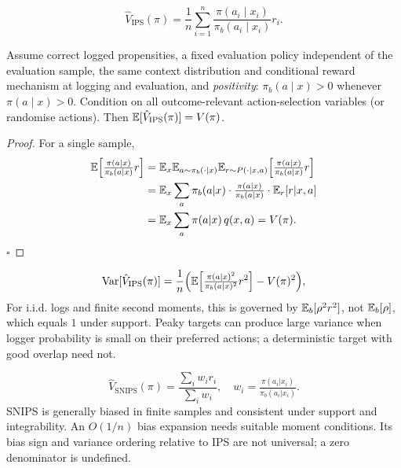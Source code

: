 \documentclass[11pt,oneside]{scrbook}
\begin{document}
\begin{definition}
\[
\hat V_{\mathrm{IPS}}(\pi) = \frac{1}{n} \sum_{i=1}^n \frac{\pi(a_i \mid x_i)}{\pi_b(a_i \mid x_i)} r_i.
\]
\end{definition}

\begin{theorem}
Assume correct logged propensities, a fixed evaluation policy independent of the evaluation sample, the same context distribution and conditional reward mechanism at logging and evaluation, and \emph{positivity}: $\pi_b(a \mid x)>0$ whenever $\pi(a \mid x)>0$. Condition on all outcome-relevant action-selection variables (or randomise actions). Then $\mathbb{E}[\hat V_{\mathrm{IPS}}(\pi)] = V(\pi)$.
\end{theorem}

\begin{proof}
For a single sample,
\begin{align*}
\mathbb{E}\Big[\tfrac{\pi(a|x)}{\pi_b(a|x)} r\Big]
&= \mathbb{E}_x \mathbb{E}_{a \sim \pi_b(\cdot|x)} \mathbb{E}_{r \sim P(\cdot|x,a)}\Big[\tfrac{\pi(a|x)}{\pi_b(a|x)} r\Big] \\
&= \mathbb{E}_x \sum_a \pi_b(a|x) \cdot \tfrac{\pi(a|x)}{\pi_b(a|x)} \cdot \mathbb{E}_r[r|x,a] \\
&= \mathbb{E}_x \sum_a \pi(a|x)\, q(x, a) = V(\pi).
\end{align*}
$\square$
\end{proof}

\begin{theorem}
\[
\operatorname{Var}[\hat V_{\mathrm{IPS}}(\pi)]
= \frac{1}{n}\Big(\mathbb{E}\Big[\tfrac{\pi(a|x)^2}{\pi_b(a|x)^2} r^2\Big] - V(\pi)^2\Big),
\]
For i.i.d. logs and finite second moments, this is governed by $\mathbb{E}_b[\rho^2r^2]$, not $\mathbb{E}_b[\rho]$, which equals $1$ under support.
Peaky targets can produce large variance when logger probability is small on their preferred actions; a deterministic target with good overlap need not.
\end{theorem}

\begin{definition}[SNIPS]
\[
\hat V_{\mathrm{SNIPS}}(\pi) = \frac{\sum_i w_i r_i}{\sum_i w_i},\quad w_i = \tfrac{\pi(a_i|x_i)}{\pi_b(a_i|x_i)}.
\]
SNIPS is generally biased in finite samples and consistent under support and integrability. An $O(1/n)$ bias expansion needs suitable moment conditions. Its bias sign and variance ordering relative to IPS are not universal; a zero denominator is undefined.
\end{definition}
\end{document}
